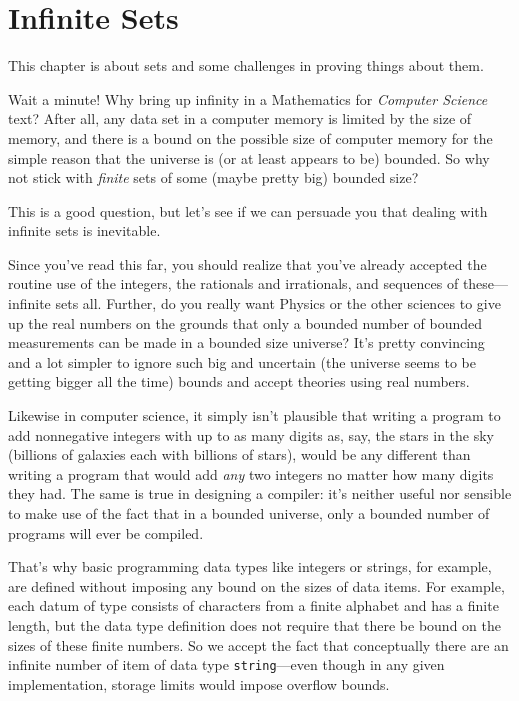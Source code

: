 \chapter{Infinite Sets}\label{infinite_chap}

This chapter is about  sets and some challenges in proving
things about them.

Wait a minute!  Why bring up infinity in a Mathematics for \emph{Computer
  Science} text?  \iffalse We've run into a lot of computer science
students who wonder why they should care about infinite sets.  They point
out that \fi
%
After all, any data set in a computer memory is limited by the size of
memory, and there is a bound on the possible size of computer memory for
the simple reason that the universe is (or at least appears to be)
bounded.  So why not stick with \emph{finite} sets of some (maybe pretty
big) bounded size?
%
\iffalse need to learn all this abstract theory of infinite sets, and this
is a good question.  \fi
%
This is a good question, but let's see if we can persuade you that dealing
with infinite sets is inevitable.

Since you've read this far, you should realize that you've already
accepted the routine use of the integers, the rationals and irrationals,
and sequences of these---infinite sets all.  Further, do you really want
Physics or the other sciences to give up the real numbers on the grounds
that only a bounded number of bounded measurements can be made in a
bounded size universe?  It's pretty convincing and a lot simpler to ignore
such big and uncertain (the universe seems to be getting bigger all the
time) bounds and accept theories using real numbers.

Likewise in computer science, it simply isn't plausible that writing a
program to add nonnegative integers with up to as many digits as, say, the
stars in the sky (billions of galaxies each with billions of stars), would
be any different than writing a program that would add \emph{any} two
integers no matter how many digits they had.  The same is true in
designing a compiler: it's neither useful nor sensible to make use of the
fact that in a bounded universe, only a bounded number of programs will
ever be compiled.

\iffalse
That's why basic programming data types like integers or strings, for
example, are defined without imposing any bound on the sizes of data
items.  For example, each datum of type  consists of
characters from a finite alphabet and has a finite length, but the data
type definition does not require that there be bound on the sizes of these
finite numbers.  So we accept the fact that conceptually there are an
infinite number of item of data type \texttt{string}---even though in any
given implementation, storage limits would impose overflow bounds.

